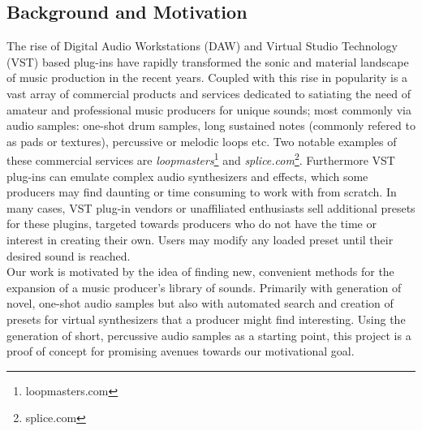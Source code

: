 \documentclass{nime-alternate} %
\begin{document}
\subsection{Background and Motivation}
The rise of Digital Audio Workstations (DAW) \cite{leider2004digital} and Virtual Studio Technology (VST) based plug-ins \cite{tanev2013virtual} have rapidly transformed the sonic and material landscape of music production in the recent years. Coupled with this rise in popularity is a vast array of commercial products and services dedicated to satiating the need of amateur and professional music producers for unique sounds; most commonly via audio samples: one-shot drum samples, long sustained notes (commonly refered to as pads or textures), percussive or melodic loops etc. Two notable examples of these commercial services are \textit{loopmasters}\footnote{loopmasters.com} and \textit{splice.com}\footnote{splice.com}. Furthermore VST plug-ins can emulate complex audio synthesizers and effects, which some producers may find daunting or time consuming to work with from scratch. In many cases, VST plug-in vendors or unaffiliated enthusiasts sell additional presets for these plugins, targeted towards producers who do not have the time or interest in creating their own. Users may modify any loaded preset until their desired sound is reached.\\
Our work is motivated by the idea of finding new, convenient methods for the expansion of a music producer's library of sounds. Primarily with generation of novel, one-shot audio samples but also with automated search and creation of presets for virtual synthesizers that a producer might find  interesting. Using the generation of short, percussive audio samples as a starting point, this project is a proof of concept for promising avenues towards our motivational goal.\\
\end{document}
